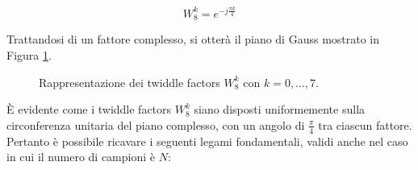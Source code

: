 \documentclass[a4paper,12pt]{report}  %
\begin{document}
\begin{equation}
    W_8^k = e^{-j \frac{\pi k}{4}} \nonumber
\end{equation}

Trattandosi di un fattore complesso, si otterà il piano di Gauss mostrato in Figura \ref{fig:twiddle_factor}.

\begin{figure}[h!]
    \centering
    \caption{Rappresentazione dei twiddle factors $W_8^k$ con $k = 0, \dots, 7$.}
    \label{fig:twiddle_factor}
\end{figure}

È evidente come i twiddle factors $W_8^k$ siano disposti uniformemente sulla circonferenza unitaria del piano complesso, con un angolo di $\frac{\pi}{4}$ tra ciascun fattore.
Pertanto è possibile ricavare i seguenti legami fondamentali, validi anche nel caso in cui il numero di campioni è $N$:
\end{document}
